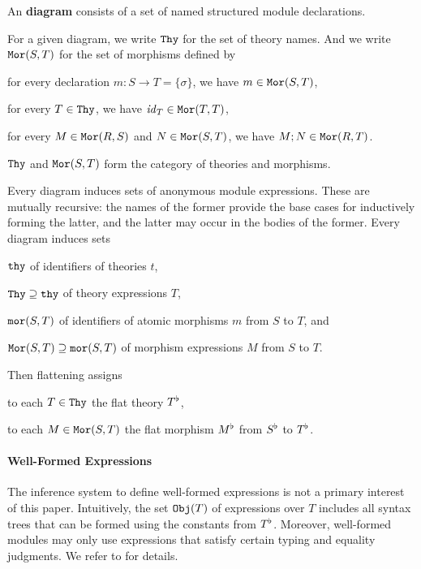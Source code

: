 An \mmt \textbf{diagram} consists of a set of named structured module declarations.
\begin{nomodexp}
For a given diagram, we write $\mathtt{Thy}$ for the set of theory names.
And we write $\mathtt{Mor}(S,T)$ for the set of morphisms defined by
\begin{compactitem}
 \item for every declaration $m:S\to T=\{\sigma\}$, we have $m\in\mathtt{Mor}(S,T)$,
 \item for every $T\in\mathtt{Thy}$, we have $\mathit{id}_{T}\in\mathtt{Mor}(T,T)$,
 \item for every $M\in\mathtt{Mor}(R,S)$ and $N\in\mathtt{Mor}(S,T)$, we have $M;N\in\mathtt{Mor}(R,T)$.
\end{compactitem}
$\mathtt{Thy}$ and $\mathtt{Mor}(S,T)$ form the category of theories and morphisms.
\end{nomodexp}
\begin{modexp}
Every diagram induces sets of anonymous module expressions.
These are mutually recursive: the names of the former provide the base cases for inductively forming the latter, and the latter may occur in the bodies of the former.
Every diagram induces sets
\begin{compactitem}
 \item $\mathtt{thy}$ of identifiers of theories $t$,
 \item $\mathtt{Thy}\supseteq \mathtt{thy}$ of theory expressions $T$,
 \item $\mathtt{mor}(S,T)$ of identifiers of atomic morphisms $m$ from $S$ to $T$, and
 \item $\mathtt{Mor}(S,T)\supseteq\mathtt{mor}(S,T)$ of morphism expressions $M$ from $S$ to $T$.
\end{compactitem}
\end{modexp}
Then flattening assigns
\begin{compactitem}
 \item to each $T\in\mathtt{Thy}$ the flat theory $T^\flat$,
 \item to each $M\in\mathtt{Mor}(S,T)$ the flat morphism $M^\flat$ from $S^\flat$ to $T^\flat$.
\end{compactitem}

\paragraph{Well-Formed Expressions}
The inference system to define well-formed expressions is not a primary interest of this paper.
Intuitively, the set $\mathtt{Obj}(T)$ of expressions over $T$ includes all syntax trees that can be formed using the constants from $T^\flat$.
Moreover, well-formed modules may only use expressions that satisfy certain typing and equality judgments.
We refer to \cite{rabe:howto:14} for details.

